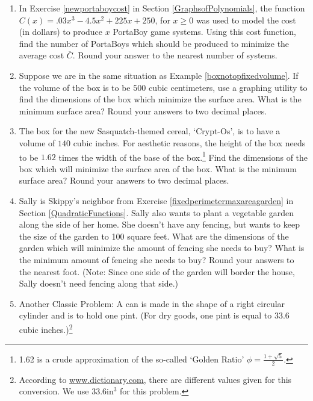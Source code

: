 \documentclass{ximera}
\begin{document}
\begin{enumerate}
\setcounter{enumi}{\value{HW}}


\item  In Exercise \ref{newportaboycost} in Section \ref{GraphsofPolynomials},  the function $C(x) = .03x^{3} - 4.5x^{2} + 225x + 250$, for $x \geq 0$ was used to model the cost (in dollars) to produce $x$ PortaBoy game systems. Using this cost function, find the number of PortaBoys which should be produced to minimize the average cost $\overline{C}$.  Round your answer to the nearest number of systems. 

\item  Suppose we are in the same situation as Example \ref{boxnotopfixedvolume}.  If the volume of the box is to be $500$ cubic centimeters, use a graphing utility to find the dimensions of the box which minimize the surface area.  What is the minimum surface area?  Round your answers to two decimal places.

\item  The box for the new Sasquatch-themed cereal, `Crypt-Os', is to have a volume of $140$ cubic inches.  For aesthetic reasons, the height of the box needs to be $1.62$ times the width of the base of the box.\footnote{1.62 is a crude approximation of the so-called `Golden Ratio' $\phi = \frac{1 + \sqrt{5}}{2}$.}  Find the dimensions of the box which will minimize the surface area of the box.  What is the minimum surface area?  Round your answers to two decimal places.   

\item \label{fixedareaminperimetergarden} Sally is Skippy's neighbor from Exercise \ref{fixedperimetermaxareagarden} in Section \ref{QuadraticFunctions}.   Sally also wants to plant a vegetable garden along the side of her home.  She doesn't have any fencing, but wants to keep the size of the garden to 100 square feet.  What are the dimensions of the garden which will minimize the amount of fencing she needs to buy?  What is the minimum amount of fencing she needs to buy? Round your answers to the nearest foot. (Note:  Since one side of the garden will border the house, Sally doesn't need fencing along that side.)



\item Another Classic Problem: A can is made in the shape of a right circular cylinder and is to hold one pint. (For dry goods, one pint is equal to $33.6$ cubic inches.)\footnote{According to \href{http://dictionary.reference.com/browse/pint}{\underline{www.dictionary.com}}, there are different values given for this conversion. We use $33.6 \text{in}^{3}$ for this problem.}  


\end{enumerate}
\end{document}
